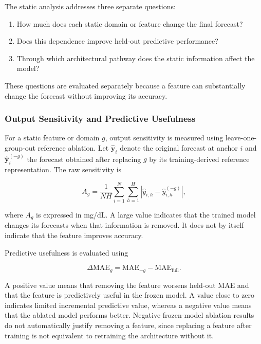 The static analysis addresses three separate questions:

\begin{enumerate}
    \item How much does each static domain or feature change the final forecast?
    \item Does this dependence improve held-out predictive performance?
    \item Through which architectural pathway does the static information affect
    the model?
\end{enumerate}

These questions are evaluated separately because a feature can substantially
change the forecast without improving its accuracy.

\subsubsection{Output Sensitivity and Predictive Usefulness}
\label{subsec:interp_static_output}

For a static feature or domain $g$, output sensitivity is measured using
leave-one-group-out reference ablation. Let
$\widehat{\mathbf{y}}_i$ denote the original forecast at anchor $i$ and
$\widehat{\mathbf{y}}_i^{(-g)}$ the forecast obtained after replacing $g$ by
its training-derived reference representation. The raw sensitivity is

\begin{equation}
A_g =
\frac{1}{NH}
\sum_{i=1}^{N}
\sum_{h=1}^{H}
\left|
\widehat{y}_{i,h}
-
\widehat{y}_{i,h}^{(-g)}
\right|,
\label{eq:static_lomo_sensitivity}
\end{equation}

where $A_g$ is expressed in mg/dL. A large value indicates that the trained
model changes its forecasts when that information is removed. It does not by
itself indicate that the feature improves accuracy.

Predictive usefulness is evaluated using

\begin{equation}
\Delta\mathrm{MAE}_g
=
\mathrm{MAE}_{-g}
-
\mathrm{MAE}_{\mathrm{full}}.
\label{eq:static_predictive_usefulness}
\end{equation}

A positive value means that removing the feature worsens held-out MAE and that
the feature is predictively useful in the frozen model. A value close to zero
indicates limited incremental predictive value, whereas a negative value means
that the ablated model performs better. Negative frozen-model ablation results
do not automatically justify removing a feature, since replacing a feature
after training is not equivalent to retraining the architecture without it.

